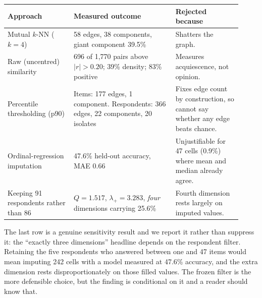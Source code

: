 \begin{center}
\begin{tabular}{p{0.26\linewidth}p{0.40\linewidth}p{0.26\linewidth}}
\toprule
Approach & Measured outcome & Rejected because \\
\midrule
Mutual $k$-NN ($k=4$)
& 58 edges, 38 components, giant component 39.5\%
& Shatters the graph. \\
Raw (uncentred) similarity
& 696 of 1{,}770 pairs above $|r|>0.20$; 39\% density; 83\% positive
& Measures acquiescence, not opinion. \\
Percentile thresholding (p90)
& Items: 177 edges, 1 component. Respondents: 366 edges, 22 components, 20 isolates
& Fixes edge count by construction, so cannot say whether any edge beats chance. \\
Ordinal-regression imputation
& 47.6\% held-out accuracy, MAE 0.66
& Unjustifiable for 47 cells (0.9\%) where mean and median already agree. \\
Keeping 91 respondents rather than 86
& $Q=1.517$, $\lambda_{+}=3.283$, \emph{four} dimensions carrying 25.6\%
& Fourth dimension rests largely on imputed values. \\
\bottomrule
\end{tabular}
\end{center}

\noindent
The last row is a genuine sensitivity result and we report it rather than suppress it: the
``exactly three dimensions'' headline depends on the respondent filter. Retaining the five
respondents who answered between one and 47 items would mean imputing 242 cells with a
model measured at 47.6\% accuracy, and the extra dimension rests disproportionately on
those filled values. The frozen filter is the more defensible choice, but the finding is
conditional on it and a reader should know that.
